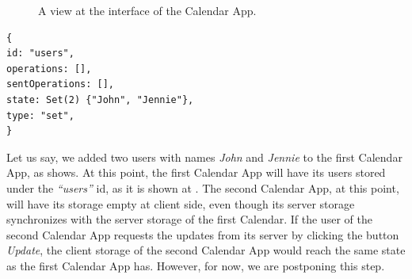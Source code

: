 \begin{figure}[!htb]
    \begin{center}
    \setlength{\fboxsep}{4pt}%
    \setlength{\fboxrule}{1pt}%
    {\scriptsize%
     }
    \caption {A view at the interface of the Calendar App.}
    \label{fig:ev-fig-2}
\end{center}
\end{figure}

\begin{lstlisting}[caption={The state of the users object store at the first Calendar App.}, label={lst:ev3}]
{
id: "users",
operations: [],
sentOperations: [],
state: Set(2) {"John", "Jennie"},
type: "set",
}
\end{lstlisting}

Let us say, we added two users with names \textit{John} and \textit{Jennie} to the first Calendar App, as  shows. At this point, the first Calendar App will have its users stored under the \textit{``users''} id, as it is shown at . The second Calendar App, at this point, will have its storage empty at client side, even though its server storage synchronizes with the server storage of the first Calendar. If the user of the second Calendar App requests the updates from its server by clicking the button \textit{Update}, the client storage of the second Calendar App would reach the same state as the first Calendar App has. However, for now, we are postponing this step.

